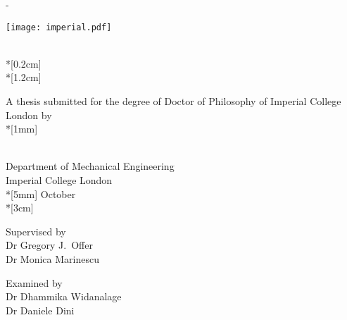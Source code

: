 \thispagestyle{empty}             %
\calccentering{\unitlength}
\begin{adjustwidth*}{\unitlength}{-\unitlength}
    \begin{adjustwidth}{-0.5cm}{-0.5cm}
        \begin{flushleft}
            \texttt{[image: imperial.pdf]}
        \end{flushleft}
        \sffamily
        \vspace*{4cm}
        \noindent
        \fontsize{32pt}{38pt}\selectfont \thesistitle{}\\*[0.2cm]
        \fontsize{26pt}{31pt}\selectfont  \textcolor{dimgray}{\thesissubtitle{}}\\*[1.2cm]
        \parbox[b]{\linewidth}{%
            \large A thesis submitted for the degree of Doctor of Philosophy of Imperial College London by \\*[1mm]
        }
        \parbox[b]{0.5\linewidth}{%
            \LARGE
            \textcolor{imperialbrick}{\thesisauthor{}}\\
            \large Department of Mechanical Engineering \\
            \Large Imperial College London \\*[5mm]
            \Large
            October \the\year\\*[3cm]
        }
        \begin{flushleft}
            \begin{minipage}[t]{0.4\textwidth}
                \large Supervised by \\
                \Large Dr Gregory J.\ Offer \\
                Dr Monica Marinescu
            \end{minipage}
            \hfill
            \begin{minipage}[t]{0.3937\textwidth}
                \large Examined by \\
                \Large Dr Dhammika Widanalage \\
                Dr Daniele Dini
            \end{minipage}
        \end{flushleft}
    \end{adjustwidth}
    \end{adjustwidth*}
    \normalfont
    \normalsize
